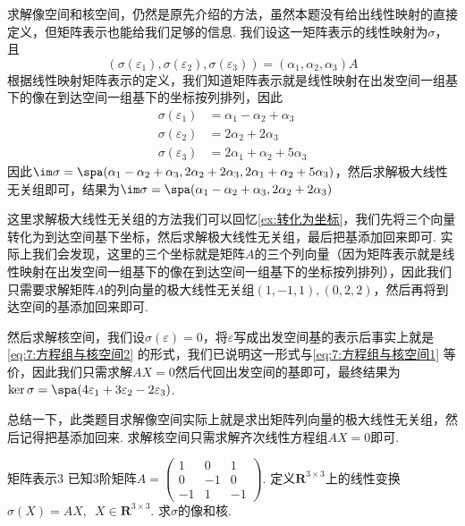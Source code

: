 \begin{solution}
    求解像空间和核空间，仍然是原先介绍的方法，虽然本题没有给出线性映射的直接定义，但矩阵表示也能给我们足够的信息. 我们设这一矩阵表示的线性映射为$\sigma$，且
    \[(\sigma(\varepsilon_1),\sigma(\varepsilon_2),\sigma(\varepsilon_3))=(\alpha_1,\alpha_2,\alpha_3)A\]
    根据线性映射矩阵表示的定义，我们知道矩阵表示就是线性映射在出发空间一组基下的像在到达空间一组基下的坐标按列排列，因此
    \begin{align*}
        \sigma(\varepsilon_1) & =\alpha_1-\alpha_2+\alpha_3   \\
        \sigma(\varepsilon_2) & =2\alpha_2+2\alpha_3          \\
        \sigma(\varepsilon_3) & =2\alpha_1+\alpha_2+5\alpha_3
    \end{align*}
    因此$\im\sigma=\spa(\alpha_1-\alpha_2+\alpha_3,2\alpha_2+2\alpha_3,2\alpha_1+\alpha_2+5\alpha_3)$，然后求解极大线性无关组即可，结果为$\im\sigma=\spa(\alpha_1-\alpha_2+\alpha_3,2\alpha_2+2\alpha_3)$

    这里求解极大线性无关组的方法我们可以回忆\autoref{ex:转化为坐标}，我们先将三个向量转化为到达空间基下坐标，然后求解极大线性无关组，最后把基添加回来即可. 实际上我们会发现，这里的三个坐标就是矩阵$A$的三个列向量（因为矩阵表示就是线性映射在出发空间一组基下的像在到达空间一组基下的坐标按列排列），因此我们只需要求解矩阵$A$的列向量的极大线性无关组$(1,-1,1),(0,2,2)$，然后再将到达空间的基添加回来即可.

    然后求解核空间，我们设$\sigma(\varepsilon)=0$，将$\varepsilon$写成出发空间基的表示后事实上就是\autoref{eq:7:方程组与核空间2} 的形式，我们已说明这一形式与\autoref{eq:7:方程组与核空间1} 等价，因此我们只需求解$AX=0$然后代回出发空间的基即可，最终结果为$\ker\sigma=\spa(4\varepsilon_1+3\varepsilon_2-2\varepsilon_3)$.
\end{solution}

总结一下，此类题目求解像空间实际上就是求出矩阵列向量的极大线性无关组，然后记得把基添加回来. 求解核空间只需求解齐次线性方程组$AX=0$即可.

\begin{example}{}{矩阵表示3}
    已知3阶矩阵$A=\begin{pmatrix}
            1 & 0 & 1 \\ 0 & -1 & 0 \\ -1 & 1 & -1
        \end{pmatrix}$. 定义$\mathbf{R}^{3 \times 3}$上的线性变换$\sigma(X)=AX,\enspace X \in \mathbf{R}^{3 \times 3}$. 求$\sigma$的像和核.
\end{example}

